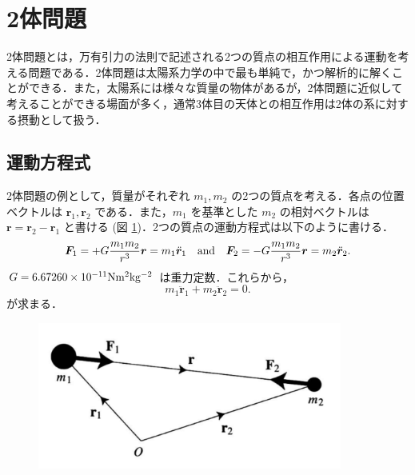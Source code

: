 \documentclass[11pt,a4paper,oneside,onecolumn]{jreport}
\begin{document}
\section{2体問題 \label{sec:2body}}
2体問題とは，万有引力の法則で記述される2つの質点の相互作用による運動を考える問題である．2体問題は太陽系力学の中で最も単純で，かつ解析的に解くことができる．また，太陽系には様々な質量の物体があるが，2体問題に近似して考えることができる場面が多く，通常3体目の天体との相互作用は2体の系に対する摂動として扱う．
\subsection{運動方程式 \label{sec:EoM}}
2体問題の例として，質量がそれぞれ $m_1, m_2$ の2つの質点を考える．各点の位置ベクトルは ${\bm r}_1, {\bm r}_2$ である．また，$m_1$ を基準とした $m_2$ の相対ベクトルは ${\bm r} = {\bm r}_2 - {\bm r}_1$ と書ける (図 \ref{fig:A})．2つの質点の運動方程式は以下のように書ける．
\begin{equation}
{\bm F}_1 = + G \frac{m_1 m_2}{r^3} {\bm r} = m_1 \ddot{{\bm r}}_1 \quad {\rm and} \quad {\bm F}_2 = - G \frac{m_1 m_2}{r^3} {\bm r} = m_2 \ddot{{\bm r}}_2. \label{eq:F}
\end{equation}
$G = 6.67260 \times 10^{-11} {\rm N m^2 kg^{-2}}$ は重力定数．これらから，
\begin{equation}
m_1 \ddot{{\bm r}}_1 + m_2 \ddot{{\bm r}}_2 = 0. \label{eq:mr}
\end{equation}
が求まる．

\begin{figure}[H]
\centering
\includegraphics[width=10cm]{./image/sec2_1.pdf}
\caption{\label{fig:A}}
\end{figure}
\end{document}
